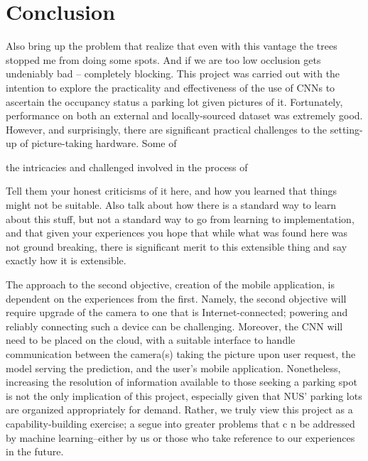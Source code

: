 \documentclass[a4paper, 11pt]{article} %
\begin{document}
\section{Conclusion}
	Also bring up the problem that realize that even with this vantage the 
	trees stopped me from doing some spots. And if we are too low occlusion 
	gets undeniably bad -- completely blocking.
	This project was carried out with the intention to explore the practicality 
	and effectiveness of the use of CNNs to ascertain the occupancy status a 
	parking lot given pictures of it. Fortunately, performance on both an 
	external and locally-sourced dataset was extremely good. However, and 
	surprisingly, there are significant practical challenges to the setting-up 
	of picture-taking hardware. Some of 
	
	the intricacies and challenged involved in the process of 



	Tell them your honest criticisms of it here, and how you learned that things
	might not be suitable.
	Also talk about how there is a standard way to learn about this stuff, but
	not a standard way to go from learning to implementation, and that given your
	experiences you hope that while what was found here was not ground breaking,
	there is significant merit to this extensible thing and say exactly how it is
	extensible.

	The approach to the second objective, creation of the mobile application, is
	dependent on the experiences from the first. Namely, the second objective will
	require upgrade of the camera to one that is Internet-connected; powering and
	reliably connecting such a device can be challenging.  Moreover, the CNN will
	need to be placed on the cloud, with a suitable interface to handle
	communication between the camera(s) taking the picture upon user request, the
	 model serving the prediction, and the user's mobile application.
	  Nonetheless, increasing the
	resolution of information available to those seeking a parking spot is not the
	only implication of this project, especially given that NUS' parking lots are
	organized appropriately for demand. Rather, we truly view this project as a
	capability-building exercise; a segue into greater problems that c n be
	addressed by machine learning--either by us or those who take reference to our
	experiences in the future.
\end{document}
